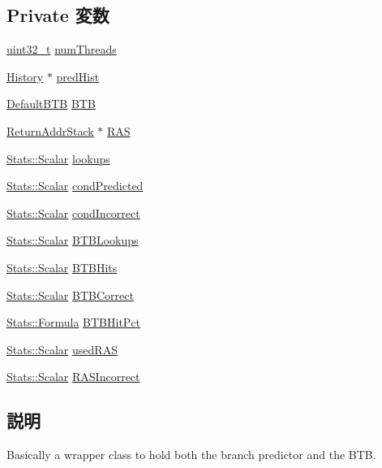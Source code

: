 \subsection*{Private 変数}
\begin{DoxyCompactItemize}
\item 
\hyperlink{Type_8hh_a435d1572bf3f880d55459d9805097f62}{uint32\_\-t} \hyperlink{classBPredUnit_a82dc714137537bc6ed526164d95f6674}{numThreads}
\item 
\hyperlink{classstd_1_1list}{History} $\ast$ \hyperlink{classBPredUnit_a17866949610525907d51191ce3271e73}{predHist}
\item 
\hyperlink{classDefaultBTB}{DefaultBTB} \hyperlink{classBPredUnit_abd4f25a0378890fc9bfa1adef49cc0ce}{BTB}
\item 
\hyperlink{classReturnAddrStack}{ReturnAddrStack} $\ast$ \hyperlink{classBPredUnit_aaff600a1f8b1b71ac7636e62cb7319dd}{RAS}
\item 
\hyperlink{classStats_1_1Scalar}{Stats::Scalar} \hyperlink{classBPredUnit_a4a025c8c15499fd8df40b46f39496321}{lookups}
\item 
\hyperlink{classStats_1_1Scalar}{Stats::Scalar} \hyperlink{classBPredUnit_a5c78c3319018e9949a36e46bfe617905}{condPredicted}
\item 
\hyperlink{classStats_1_1Scalar}{Stats::Scalar} \hyperlink{classBPredUnit_a185c5e4f3b5ec64fe7a1120ead854d93}{condIncorrect}
\item 
\hyperlink{classStats_1_1Scalar}{Stats::Scalar} \hyperlink{classBPredUnit_aa62bafdbd09ec7c26031a8b58a042569}{BTBLookups}
\item 
\hyperlink{classStats_1_1Scalar}{Stats::Scalar} \hyperlink{classBPredUnit_a62943c2b7168001cfb6cf5f3a724e04a}{BTBHits}
\item 
\hyperlink{classStats_1_1Scalar}{Stats::Scalar} \hyperlink{classBPredUnit_a05ffad6906b6204237963e1d3652be90}{BTBCorrect}
\item 
\hyperlink{classStats_1_1Formula}{Stats::Formula} \hyperlink{classBPredUnit_adeb28302a86d176687ddfc4227ef78ff}{BTBHitPct}
\item 
\hyperlink{classStats_1_1Scalar}{Stats::Scalar} \hyperlink{classBPredUnit_af589fa2a7ce83147ab8c0d4169c0748f}{usedRAS}
\item 
\hyperlink{classStats_1_1Scalar}{Stats::Scalar} \hyperlink{classBPredUnit_a8f16f8a930ca557e2a627a4dfa15e67f}{RASIncorrect}
\end{DoxyCompactItemize}


\subsection{説明}
Basically a wrapper class to hold both the branch predictor and the BTB. 

